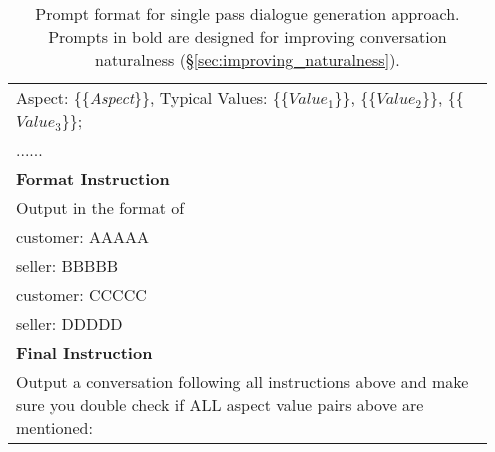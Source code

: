 \begin{table*}[t]
\begin{center}
\begin{tabular}{p{0.95\linewidth} }
    Aspect: \{\{\textit{Aspect}\}\}, Typical Values: \{\{\textit{$Value_1$}\}\}, \{\{\textit{$Value_2$}\}\}, \{\{\textit{$Value_3$}\}\}; \\ 
  ...... \\\hdashline
  \textbf{Format Instruction} \\
  Output in the format of \\
customer: AAAAA \\
seller: BBBBB \\
customer: CCCCC \\
seller: DDDDD \\ \hdashline
\textbf{Final Instruction} \\
Output a conversation following all instructions above and make sure you double check if ALL aspect value pairs above are mentioned: \\ \hline
    \end{tabular}
    \caption{Prompt format for single pass dialogue generation approach. Prompts in bold are designed for improving conversation naturalness (\S\ref{sec:improving_naturalness}).} \label{tab:single_pass_prompt}
\end{center}
\end{table*}


